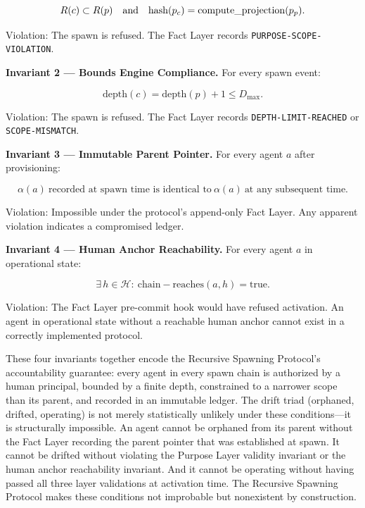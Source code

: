 \begin{equation}
R(c) \subset R(p)\quad \text{and} \quad \mathrm{hash}(p_c) = \mathrm{compute\text{\textunderscore}projection}(p_p).
\label{eq:inv-purpose-validity}
\end{equation}

Violation: The spawn is refused. The Fact Layer records \texttt{PURPOSE-SCOPE-VIOLATION}.

\bigskip
\noindent\textbf{Invariant 2 — Bounds Engine Compliance.} For every spawn event:

\begin{equation}
\mathrm{depth}(c) = \mathrm{depth}(p) + 1 \leq D_{\max}.
\label{eq:inv-bounds-compliance}
\end{equation}

Violation: The spawn is refused. The Fact Layer records \texttt{DEPTH-LIMIT-REACHED} or \texttt{SCOPE-MISMATCH}.

\bigskip
\noindent\textbf{Invariant 3 — Immutable Parent Pointer.} For every agent $a$ after provisioning:

\begin{equation}
\alpha(a)\ \text{recorded at spawn time is identical to}\ \alpha(a)\ \text{at any subsequent time}.
\label{eq:inv-immutable-parent}
\end{equation}

Violation: Impossible under the protocol's append-only Fact Layer. Any apparent violation indicates a compromised ledger.

\bigskip
\noindent\textbf{Invariant 4 — Human Anchor Reachability.} For every agent $a$ in operational state:

\begin{equation}
\exists\, h \in \mathcal{H}:\ \mathrm{chain-reaches}(a, h) = \mathrm{true}.
\label{eq:inv-human-anchor}
\end{equation}

Violation: The Fact Layer pre-commit hook would have refused activation. An agent in operational state without a reachable human anchor cannot exist in a correctly implemented protocol.

\bigskip
These four invariants together encode the Recursive Spawning Protocol's accountability guarantee: every agent in every spawn chain is authorized by a human principal, bounded by a finite depth, constrained to a narrower scope than its parent, and recorded in an immutable ledger. The drift triad (orphaned, drifted, operating) is not merely statistically unlikely under these conditions—it is structurally impossible. An agent cannot be orphaned from its parent without the Fact Layer recording the parent pointer that was established at spawn. It cannot be drifted without violating the Purpose Layer validity invariant or the human anchor reachability invariant. And it cannot be operating without having passed all three layer validations at activation time. The Recursive Spawning Protocol makes these conditions not improbable but nonexistent by construction.
